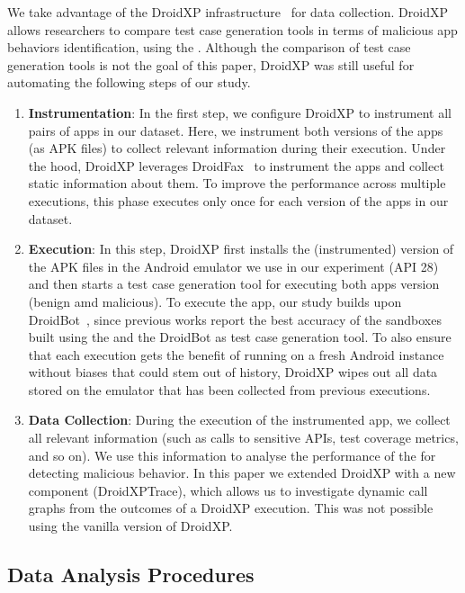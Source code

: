 We take advantage of the DroidXP infrastructure~\cite{DBLP:conf/scam/CostaMCMVBC20}
for data collection. DroidXP allows researchers to compare 
test case generation tools in terms of malicious app behaviors identification, using the \mas. Although the comparison of test
case generation tools is not the goal of this paper, DroidXP
was still useful for automating the following steps of our study.


\begin{enumerate}[S1]
 \item \textbf{Instrumentation}: In the first step,
we configure DroidXP to instrument all pairs of apps in our dataset.
Here, we instrument both versions of the apps (as APK files) to collect relevant information during their execution. Under the hood, DroidXP leverages
DroidFax~\cite{DBLP:conf/icsm/CaiR17a} to instrument the apps and collect static
information about them. To improve the performance across multiple executions,
this phase executes only once for each version of the apps in our dataset.

\item \textbf{Execution}: In this step, DroidXP first installs the (instrumented) version of the APK files in the Android emulator we use in our experiment (API 28) and then starts a test case generation tool for executing both apps version (benign amd malicious). To execute the app, our study builds upon DroidBot~\cite{DBLP:conf/icse/LiYGC17}, since previous works report the best accuracy of the sandboxes built using the \mas and the DroidBot as test case generation tool. To also ensure that each execution gets the benefit of running on a fresh Android instance without biases that could stem out of history, DroidXP wipes out all data stored on the emulator that has been collected from previous executions.


\item \textbf{Data Collection}: During the execution of the instrumented app, we collect all relevant information (such as calls to sensitive APIs, test coverage metrics, and so on). We use this information to analyse the performance of the \mas for detecting malicious behavior. In this paper we extended DroidXP with a new component (DroidXPTrace), which allows us to investigate dynamic call graphs from the outcomes of a DroidXP execution. This was not possible using the vanilla version of DroidXP.
\end{enumerate}

\subsection{Data Analysis Procedures} \label{sec:dataAnalysisProc}

